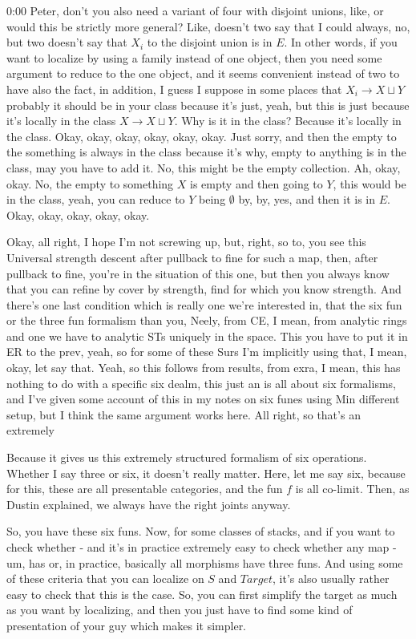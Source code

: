 \begin{unfinished}{0:00}
Peter, don't you also need a variant of four with disjoint unions, like, or would this be strictly more general? Like, doesn't two say that I could always, no, but two doesn't say that $X_i$ to the disjoint union is in $E$. In other words, if you want to localize by using a family instead of one object, then you need some argument to reduce to the one object, and it seems convenient instead of two to have also the fact, in addition, I guess I suppose in some places that $X_i \to X \sqcup Y$ probably it should be in your class because it's just, yeah, but this is just because it's locally in the class $X \to X \sqcup Y$. Why is it in the class? Because it's locally in the class. Okay, okay, okay, okay, okay, okay. Just sorry, and then the empty to the something is always in the class because it's why, empty to anything is in the class, may you have to add it. No, this might be the empty collection. Ah, okay, okay. No, the empty to something $X$ is empty and then going to $Y$, this would be in the class, yeah, you can reduce to $Y$ being $\emptyset$ by, by, yes, and then it is in $E$. Okay, okay, okay, okay, okay.

Okay, all right, I hope I'm not screwing up, but, right, so to, you see this Universal strength descent after pullback to fine for such a map, then, after pullback to fine, you're in the situation of this one, but then you always know that you can refine by cover by strength, find for which you know strength. And there's one last condition which is really one we're interested in, that the six fun or the three fun formalism than you, Neely, from CE, I mean, from analytic rings and one we have to analytic STs uniquely in the space. This you have to put it in ER to the prev, yeah, so for some of these Surs I'm implicitly using that, I mean, okay, let say that. Yeah, so this follows from results, from exra, I mean, this has nothing to do with a specific six dealm, this just an is all about six formalisms, and I've given some account of this in my notes on six funes using Min different setup, but I think the same argument works here. All right, so that's an extremely

Because it gives us this extremely structured formalism of six operations. Whether I say three or six, it doesn't really matter. Here, let me say six, because for this, these are all presentable categories, and the fun $f$ is all co-limit. Then, as Dustin explained, we always have the right joints anyway.

So, you have these six funs. Now, for some classes of stacks, and if you want to check whether - and it's in practice extremely easy to check whether any map - um, has or, in practice, basically all morphisms have three funs. And using some of these criteria that you can localize on $S$ and $Target$, it's also usually rather easy to check that this is the case. So, you can first simplify the target as much as you want by localizing, and then you just have to find some kind of presentation of your guy which makes it simpler.


\end{unfinished}
